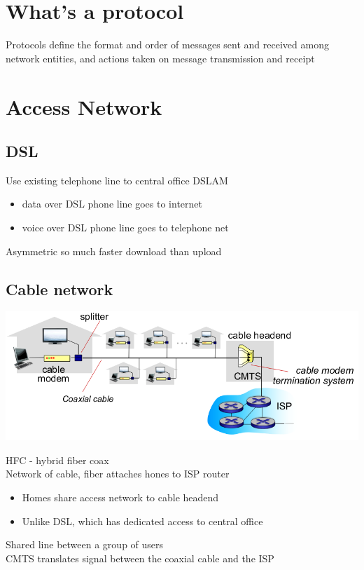 \documentclass{article}[18pt]
\begin{document}
\section{What's a protocol}
Protocols define the format and order of messages sent and received among network entities, and actions taken on message transmission and receipt
\section{Access Network}
\subsection{DSL}
Use existing telephone line to central office DSLAM
\begin{itemize}
	\item data over DSL phone line goes to internet
	\item voice over DSL phone line goes to telephone net
\end{itemize}
Asymmetric so much faster download than upload
\subsection{Cable network}
\begin{center}
	\includegraphics[scale=0.7]{Cable}
\end{center}
HFC - hybrid fiber coax\\
Network of cable, fiber attaches hones to ISP router
\begin{itemize}
	\item Homes share access network to cable headend
	\item Unlike DSL, which has dedicated access to central office
\end{itemize}
Shared line between a group of users\\
CMTS translates signal between the coaxial cable and the ISP
\end{document}
